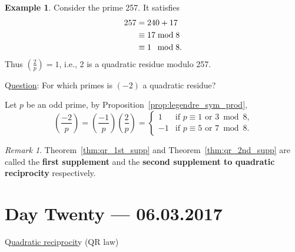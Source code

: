 \documentclass{amsbook}
\theoremstyle{plain}
\theoremstyle{definition}
\newtheorem{example}[theorem]{Example}
\theoremstyle{remark}
\newtheorem{remark}[theorem]{Remark}
\numberwithin{equation}{chapter}
\numberwithin{figure}{chapter}
\begin{document}
\begin{example}
  Consider the prime 257. It satisfies
  \begin{align}
    257 &= 240 + 17 \\
        &\equiv 17 \bmod 8 \\
        &\equiv 1 \hspace{1.7mm}\bmod 8.
  \end{align}
  Thus $\left( \frac{2}p \right) = 1$, i.e., 2 is a quadratic residue modulo 257.
\end{example}

Q\underline{uestion}: For which primes is $(-2)$ a quadratic residue?

Let $p$ be an odd prime, by Proposition~\ref{prop:legendre_sym_prod},
\[
  \left( \frac{-2}p \right) =   \left( \frac{-1}p \right)   \left( \frac{2}p \right) = \left\{ \begin{array}{rl}
                                                               1 & \text{if $p \equiv 1 \text { or } 3 \bmod 8$,} \\[2mm]
                                                               -1 & \text{if $p \equiv 5 \text { or } 7 \bmod 8$.}
                                                                                               \end{array} \right.
\]
\begin{remark}
  Theorem~\ref{thm:qr_1st_supp} and Theorem~\ref{thm:qr_2nd_supp} are called the \textbf{first supplement} and the \textbf{second supplement to quadratic reciprocity} respectively.
\end{remark}

\chapter[Lecture Twenty]{Day Twenty \hfill {\footnotesize \rm --- 06.03.2017}}

Q\underline{uadratic reci}p\underline{rocit}y (QR law)
\end{document}
